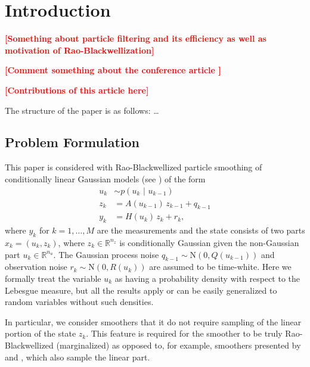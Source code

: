 \documentclass[twocolumn]{autart}    %
\newcommand{\comment}[1]{\textcolor{red}{\textbf{[#1]}}}
\begin{document}
\section{Introduction}
%
\comment{Something about particle filtering and its efficiency as well as
motivation of Rao-Blackwellization}

\comment{Comment something about the conference article
  \cite{Sarkka+Bunch+Godsill:2012}}

\comment{Contributions of this article here}

The structure of the paper is as follows: \ldots


\subsection{Problem Formulation}
%
This paper is considered with Rao-Blackwellized particle smoothing
of conditionally linear Gaussian models
(see \cite{Doucet+Godsill+Andrieu:2000}) of the form
%
\begin{equation}
\begin{split}
  u_k &\sim p(u_k \, \,|\, \, u_{k-1}) \\
  z_k &= A(u_{k-1}) \, z_{k-1} + q_{k-1} \\
  y_k &= H(u_k) \, z_{k} + r_{k},
\end{split}
\label{eq:condgauss}
\end{equation}
%
where $y_k$ for $k=1,\ldots,M$ are the measurements and the state
consists of two parts $x_k = (u_k,z_k)$, where $z_k \in
\mathbb{R}^{n_z}$ is conditionally Gaussian given the non-Gaussian
part $u_k \in \mathbb{R}^{n_u}$. The Gaussian process noise $q_{k-1}
\sim \mathrm{N}(0, Q(u_{k-1}))$ and observation noise $r_{k} \sim
\mathrm{N}(0, R(u_{k}))$ are assumed to be time-white. Here we
formally treat the variable $u_k$ as having a probability density with
respect to the Lebesgue measure, but all the results apply or can be
easily generalized to random variables without such densities.

In particular, we consider smoothers that it do not require
sampling of the linear portion of the state $z_k$. This feature is
required for the smoother to be truly Rao-Blackwellized
(marginalized) as opposed to, for example, smoothers presented by
\cite{Fong+Godsill+Doucet+West:2002} and \cite{Lindsten+Schon:2011},
which also sample the linear part. 
\end{document}
